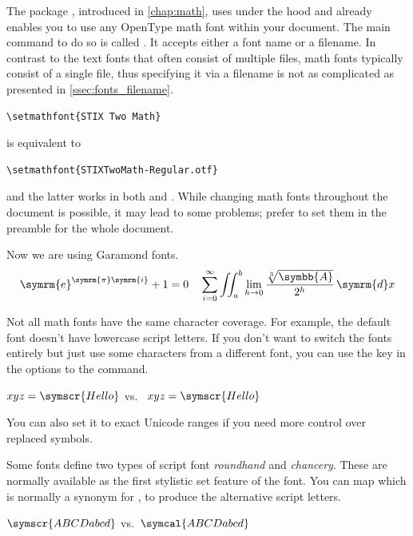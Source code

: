The package , introduced in \autoref{chap:math}, uses
 under the hood and already enables you to use any OpenType math
font within your document. The main command to do so is called
. It accepts either a font name or a filename. In contrast to
the text fonts that often consist of multiple files, math fonts typically
consist of a single file, thus specifying it via a filename is not as
complicated as presented in \autoref{ssec:fonts_filename}.
\begin{code}
  \begin{verbatim}
\setmathfont{STIX Two Math}
  \end{verbatim}
\end{code}
is equivalent to
\begin{code}
  \begin{verbatim}
\setmathfont{STIXTwoMath-Regular.otf}
  \end{verbatim}
\end{code}
and the latter works in both  and . While
changing math fonts throughout the document is possible, it may lead to some
problems; prefer to set them in the preamble for the whole document.
\begin{example}[standalone, paperheight=2.5cm, paperwidth=6cm]
\usepackage{unicode-math}%
\setmainfont{EB Garamond}

\noindent %
Now we are using Garamond fonts.
\[
  \symrm{e}^{\symrm{\pi}
    \symrm{i}} + 1 = 0 \quad
  \sum_{i=0}^\infty \iint_a^b
  \lim_{h\to0}\frac{\sqrt[3]{
    \symbb{A}}}{2^h}\,\symrm{d}x
\]
\end{example}

Not all math fonts have the same character coverage. For example, the default
font doesn't have lowercase script letters. If you don't want to switch the
fonts entirely but just use some characters from a different font, you
can use the  key in the options to the  command.
\begin{example}[standalone, paperheight=1cm, paperwidth=6cm]
\usepackage{unicode-math}%
\noindent %
\(xyz = \symscr{Hello}\) vs.\
\(xyz = \symscr{Hello}\)
\end{example}
You can also set it to exact Unicode ranges if you need more control over
replaced symbols.

Some fonts define two types of script font \emph{roundhand} and \emph{chancery}. These are
normally available as the first stylistic set feature of the font. You can map
\csi{symcal} which is normally a synonym for \csi{symscr}, to produce the
alternative script letters.
\begin{example}[standalone, paperheight=1cm, paperwidth=6cm]
\usepackage{unicode-math}%

\noindent %
\(\symscr{ABCDabcd}\) vs.\
\(\symcal{ABCDabcd}\)
\end{example}

